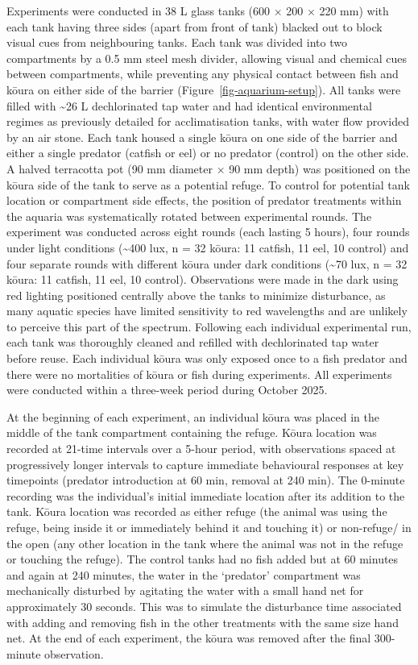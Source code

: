 \documentclass[
  12pt,
  a4paper,
]{scrbook}
\begin{document}
Experiments were conducted in 38 L glass tanks (600 × 200 × 220 mm) with
each tank having three sides (apart from front of tank) blacked out to
block visual cues from neighbouring tanks. Each tank was divided into
two compartments by a 0.5 mm steel mesh divider, allowing visual and
chemical cues between compartments, while preventing any physical
contact between fish and kōura on either side of the barrier
(Figure~\ref{fig-aquarium-setup}). All tanks were filled with
\textasciitilde26 L dechlorinated tap water and had identical
environmental regimes as previously detailed for acclimatisation tanks,
with water flow provided by an air stone. Each tank housed a single
kōura on one side of the barrier and either a single predator (catfish
or eel) or no predator (control) on the other side. A halved terracotta
pot (90 mm diameter × 90 mm depth) was positioned on the kōura side of
the tank to serve as a potential refuge. To control for potential tank
location or compartment side effects, the position of predator
treatments within the aquaria was systematically rotated between
experimental rounds. The experiment was conducted across eight rounds
(each lasting 5 hours), four rounds under light conditions
(\textasciitilde400 lux, n = 32 kōura: 11 catfish, 11 eel, 10 control)
and four separate rounds with different kōura under dark conditions
(\textasciitilde70 lux, n = 32 kōura: 11 catfish, 11 eel, 10 control).
Observations were made in the dark using red lighting positioned
centrally above the tanks to minimize disturbance, as many aquatic
species have limited sensitivity to red wavelengths and are unlikely to
perceive this part of the spectrum. Following each individual
experimental run, each tank was thoroughly cleaned and refilled with
dechlorinated tap water before reuse. Each individual kōura was only
exposed once to a fish predator and there were no mortalities of kōura
or fish during experiments. All experiments were conducted within a
three-week period during October 2025.

At the beginning of each experiment, an individual kōura was placed in
the middle of the tank compartment containing the refuge. Kōura location
was recorded at 21-time intervals over a 5-hour period, with
observations spaced at progressively longer intervals to capture
immediate behavioural responses at key timepoints (predator introduction
at 60 min, removal at 240 min). The 0-minute recording was the
individual's initial immediate location after its addition to the tank.
Kōura location was recorded as either refuge (the animal was using the
refuge, being inside it or immediately behind it and touching it) or
non-refuge/ in the open (any other location in the tank where the animal
was not in the refuge or touching the refuge). The control tanks had no
fish added but at 60 minutes and again at 240 minutes, the water in the
`predator' compartment was mechanically disturbed by agitating the water
with a small hand net for approximately 30 seconds. This was to simulate
the disturbance time associated with adding and removing fish in the
other treatments with the same size hand net. At the end of each
experiment, the kōura was removed after the final 300-minute
observation.
\end{document}
